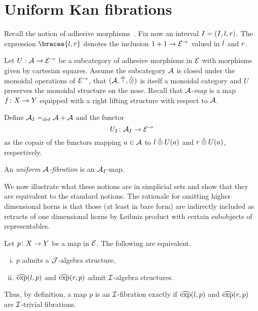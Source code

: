 \documentclass[reqno,10pt,a4paper,oneside]{amsart}
\begin{document}
\section{Uniform Kan fibrations}



Recall the notion of adhesive morphisms~\cite{garner-lack:adhesive}. Fix now an interval $\interval = (\interval, \intervall, \intervalr)$. 
The expression $\braces{\intervall, \intervalr}$ denotes the inclusion $1 + 1 \to \catE^{\to}$ valued in $\intervall$ and $\intervalr$.


\medskip

Let $U : \cal{A} \to \catE^{\to}$ be a subcategory of adhesive morphisms in $\catE$ with morphisms given by cartesian squares.
Assume the subcategory $\cal{A}$ is closed under the monoidal operations of $\catE^{\to}$, \ie that $(\cal{A}, \hatunit, \hatotimes)$ is itself a monoidal category and $U$ preserves the monoidal structure on the nose. Recall that \emph{$\cal{A}$-map} is a map $f \co X \to Y$ equipped with a right lifting structure with respect to $\cal{A}$.

\medskip


Define $\cal{A}_\interval \defeq \cal{A} + \cal{A}$ and the functor
\[
U_\interval \co \cal{A}_\interval \to \cal{E}^\to 
\]
as the copair of the functors mapping $a \in \cal{A}$ to $\intervall \hatotimes U(a)$ and $\intervalr \hatotimes U(a)$, respectively. 

\begin{definition} An \emph{uniform $\cal{A}$-fibration} is an $\cal{A}_\interval$-map.
\end{definition} 


We now illustrate what these notions are in simplicial sets and show that they are equivalent to the standard notions. The rationale for omitting higher dimensional horns is that those (at least in bare form) are indirectly included as retracts of one dimensional horns by Leibniz product with certain subobjects of representables. 

\begin{lemma} Let $p \co X \to Y$ be a map in $\cal{E}$. The following are equivalent.
\begin{enumerate}[(i)]
\item $p$ admits a $\cal{J}$-algebra structure,
\item $\hatexp(\intervall, p)$ and $\hatexp(\intervalr, p)$ admit $\cal{I}$-algebra structures.
\end{enumerate} 
Thus, by definition, a map $p$ is an $\cal{I}$-fibration exactly if $\hatexp(\intervall, p)$ and $\hatexp(\intervalr, p)$ are $\cal{I}$-trivial fibrations.
\end{lemma} 
\end{document}
